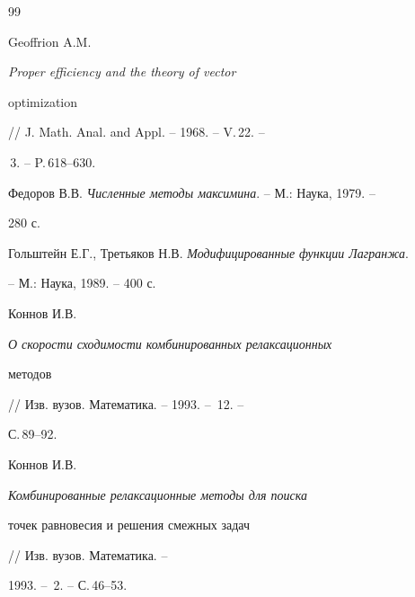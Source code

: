 \begin{thebibliography}{99}


Geoffrion A.M. {\em Proper efficiency and the theory of vector


optimization} // J. Math. Anal. and Appl. -- 1968. -- V.\,22. --


\No\,3. -- P.\,618--630.




Федоров В.В. {\em Численные методы максимина}. -- М.: Наука, 1979. --


280 с.




Гольштейн Е.Г., Третьяков Н.В. {\em Модифицированные функции Лагранжа}.


-- М.: Наука, 1989. -- 400 с.




Коннов И.В. {\em О скорости сходимости комбинированных релаксационных


методов} // Изв. вузов. Математика. -- 1993. -- \No\,12. --


С.\,89--92.




Коннов И.В. {\em Комбинированные релаксационные методы для поиска


точек равновесия и решения смежных задач} // Изв. вузов. Математика. --


1993. -- \No\,2. -- С.\,46--53.





\end{thebibliography}





\vskip 2cm

















